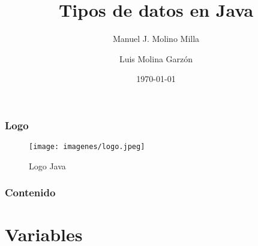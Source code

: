 \documentclass{beamer}
\title{Tipos de datos en Java}
\author{Manuel J. Molino Milla \and Luis Molina Garzón}
\date{\today} %
\institute{IES Virgen del Carmen \and Departamento de Informática}
\begin{document}
\begin{frame}
  \titlepage
\end{frame}

\begin{frame}
    \frametitle{Logo}
\begin{figure}
\texttt{[image: imagenes/logo.jpeg]} 
\caption{Logo Java}
\end{figure}
\end{frame}

\begin{frame}
  \frametitle{Contenido}
\begin{footnotesize}
  \tableofcontents[pausesections]
\end{footnotesize}\end{frame}


\section{Variables}
\end{document}
